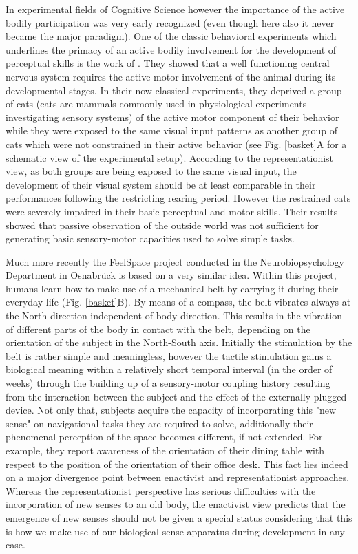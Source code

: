 In experimental fields of Cognitive Science however the importance of the
active bodily participation was very early recognized (even though here
also it never became the major paradigm). One of the classic behavioral
experiments which underlines the primacy of an active bodily involvement
for the development of perceptual skills is the work of \cite{held1963a}.
They showed that a well functioning central nervous system requires the
active motor involvement of the animal during its developmental stages.  In
their now classical experiments, they deprived a group of cats (cats are
mammals commonly used in physiological experiments investigating sensory
systems) of the active motor component of their behavior while they were
exposed to the same visual input patterns as another group of cats which
were not constrained in their active behavior (see Fig.  \ref{basket}A for
a schematic view of the experimental setup).  According to the
representationist view, as both groups are being exposed to the same visual
input, the development of their visual system should be at least comparable
in their performances following the restricting rearing period.  However
the restrained cats were severely impaired in their basic perceptual and
motor skills. Their results showed that passive observation of the outside
world was not sufficient for generating basic sensory-motor capacities used
to solve simple tasks.

Much more recently the FeelSpace\textsuperscript{\textregistered}
\citep{nagel2005a} project conducted in the Neurobiopsychology Department
in Osnabr\"uck is based on a very similar idea. Within this project, humans
learn how to make use of a mechanical belt by carrying it during their
everyday life (Fig. \ref{basket}B). By means of a compass, the belt
vibrates always at the North direction independent of body direction. This
results in the vibration of different parts of the body in contact with the
belt, depending on the orientation of the subject in the North-South axis.
Initially the stimulation by the belt is rather simple and meaningless,
however the tactile stimulation gains a biological meaning within a
relatively short temporal interval (in the order of weeks) through the
building up of a sensory-motor coupling history resulting from the
interaction between the subject and the effect of the externally plugged
device.  Not only that, subjects acquire the capacity of incorporating this
"new sense" on navigational tasks they are required to solve, additionally
their phenomenal perception of the space becomes different, if not
extended.  For example, they report awareness of the orientation of their
dining table with respect to the position of the orientation of their
office desk.  This fact lies indeed on a major divergence point between
enactivist and representationist approaches. Whereas the representationist
perspective has serious difficulties with the incorporation of new senses
to an old body, the enactivist view predicts that the emergence of new
senses should not be given a special status considering that this is how we
make use of our biological sense apparatus during development in any case.


